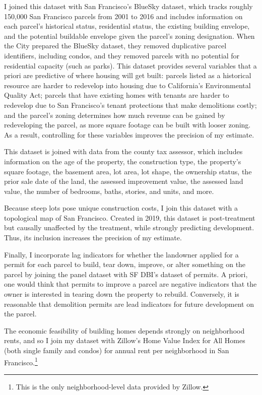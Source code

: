\documentclass[a4paper,12pt]{article}
\begin{document}
I joined this dataset with San Francisco's BlueSky dataset, which tracks roughly 150,000 San Francisco parcels from 2001 to 2016 and includes information on each parcel's historical status, residential status, the existing building envelope, and the potential buildable envelope given the parcel's zoning designation.\cite{SFHousingElement2022AppendixB} When the City prepared the BlueSky dataset, they removed duplicative parcel identifiers, including condos, and they removed parcels with no potential for residential capacity (such as parks). This dataset provides several variables that a priori are predictive of where housing will get built: parcels listed as a historical resource are harder to redevelop into housing due to California's Environmental Quality Act; parcels that have existing homes with tenants are harder to redevelop due to San Francisco's tenant protections that make demolitions costly; and the parcel's zoning determines how much revenue can be gained by redeveloping the parcel, as more square footage can be built with looser zoning. As a result, controlling for these variables improves the precision of my estimate.

This dataset is joined with data from the county tax assessor, which includes information on the age of the property, the construction type, the property's square footage, the basement area, lot area, lot shape, the ownership status, the prior sale date of the land, the assessed improvement value, the assessed land value, the number of bedrooms, baths, stories, and units, and more.  

Because steep lots pose unique construction costs, I join this dataset with a topological map of San Francisco. Created in 2019, this dataset is post-treatment but causally unaffected by the treatment, while strongly predicting development. Thus, its inclusion increases the precision of my estimate.

Finally, I incorporate lag indicators for whether the landowner applied for a permit for each parcel to build, tear down, improve, or alter something on the parcel by joining the panel dataset with SF DBI's dataset of permits. A priori, one would think that permits to improve a parcel are negative indicators that the owner is interested in tearing down the property to rebuild. Conversely, it is reasonable that demolition permits are lead indicators for future development on the parcel.

The economic feasibility of building homes depends strongly on neighborhood rents, and so I join my dataset with Zillow's Home Value Index for All Homes (both single family and condos) for annual rent per neighborhood in San Francisco.\footnote{This is the only neighborhood-level data provided by Zillow.}
\end{document}
